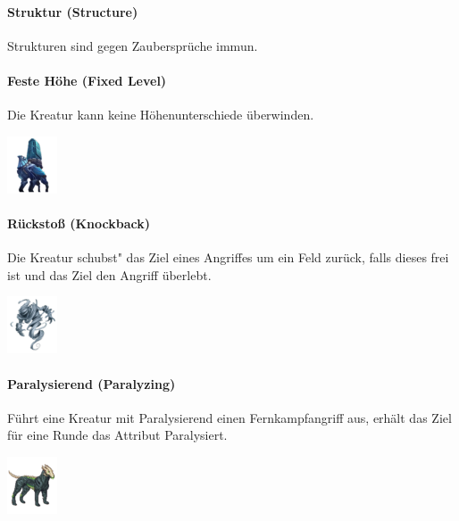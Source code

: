\documentclass[a4paper,12pt]{scrartcl}
\begin{document}
	\paragraph{Struktur (\glqq Structure\grqq\hspace{0.05em})}
	Strukturen sind gegen Zaubersprüche immun.
	
	\paragraph{Feste Höhe (\glqq Fixed Level\grqq\hspace{0.05em})}
	Die Kreatur kann keine Höhenunterschiede überwinden.\\
	\begin{center}\includegraphics{Prog2_EA_V2/Art/IcarusTower.png}\end{center}
	
	\paragraph{Rückstoß (\glqq Knockback\grqq\hspace{0.05em})}
	Die Kreatur \glqq schubst" das Ziel eines Angriffes um ein Feld zurück, falls dieses frei ist und das Ziel den Angriff überlebt.\\
	\begin{center}\includegraphics{Prog2_EA_V2/Art/AirElemental.png}\end{center}
	
	\paragraph{Paralysierend (\glqq Paralyzing\grqq\hspace{0.05em})}
	Führt eine Kreatur mit Paralysierend einen Fernkampfangriff aus, erhält das Ziel für eine Runde das Attribut Paralysiert.\\
	\begin{center}\includegraphics{Prog2_EA_V2/Art/Hellhound.png}\end{center}
	
\end{document}
